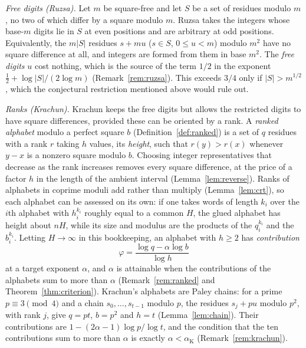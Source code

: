 \documentclass[11pt]{article}
\theoremstyle{definition}
\theoremstyle{remark}
\newcommand{\card}[1]{\lvert #1\rvert}
\begin{document}
\emph{Free digits (Ruzsa).} Let $m$ be square-free and let $S$ be a set of
residues modulo $m$, no two of which differ by a square modulo $m$. Ruzsa
takes the integers whose base-$m$ digits lie in $S$ at even positions and are
arbitrary at odd positions. Equivalently, the $m\card S$ residues $s+mu$
($s\in S$, $0\le u<m$) modulo $m^2$ have no square difference at all, and
integers are formed from them in base $m^2$. The \emph{free digits} $u$ cost
nothing, which is the source of the term $1/2$ in the exponent
$\frac12+\log\card S/(2\log m)$ (Remark~\ref{rem:ruzsa}). This exceeds $3/4$
only if $\card S>m^{1/2}$, which the conjectural restriction mentioned above
would rule out.

\emph{Ranks (Krachun).} Krachun keeps the free digits but allows the
restricted digits to have square differences, provided these can be oriented
by a rank. A \emph{ranked alphabet} modulo a perfect square $b$
(Definition~\ref{def:ranked}) is a set of $q$ residues with a rank $r$ taking
$h$ values, its \emph{height}, such that $r(y)>r(x)$ whenever $y-x$ is a
nonzero square modulo $b$. Choosing integer representatives that decrease as the rank increases
removes every square difference, at the price of a factor $h$ in the length of
the ambient interval (Lemma~\ref{lem:reverse}). Ranks of alphabets in coprime
moduli add rather than multiply (Lemma~\ref{lem:crt}), so each alphabet can be
assessed on its own: if one takes words of length $k_i$ over the $i$th
alphabet with $h_i^{k_i}$ roughly equal to a common $H$, the glued alphabet has
height about $nH$, while its size and modulus are the products of the
$q_i^{k_i}$ and the $b_i^{k_i}$. Letting $H\to\infty$ in this bookkeeping, an
alphabet with $h\ge2$ has \emph{contribution}
\begin{equation}\label{eq:rankcontribution}
 \varphi=\frac{\log q-\alpha\log b}{\log h}
\end{equation}
at a target exponent $\alpha$, and $\alpha$ is attainable when the
contributions of the alphabets sum to more than $\alpha$
(Remark~\ref{rem:ranked} and Theorem~\ref{thm:criterion}).
Krachun's alphabets are Paley chains: for a prime $p\equiv3\pmod4$ and a chain
$s_0,\ldots,s_{t-1}$ modulo $p$, the residues $s_j+pu$ modulo $p^2$, with
rank $j$, give $q=pt$, $b=p^2$ and $h=t$ (Lemma~\ref{lem:chain}). Their
contributions are $1-(2\alpha-1)\log p/\log t$, and the condition that the
ten contributions sum to more than $\alpha$ is exactly $\alpha<\alpha_{\mathrm
K}$ (Remark~\ref{rem:krachun}).
\end{document}
